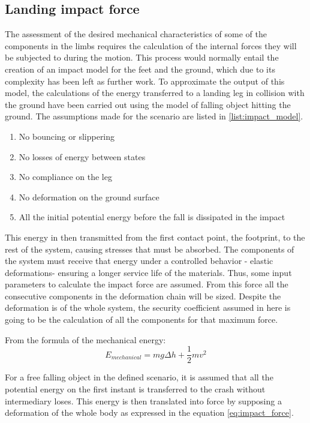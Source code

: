 \subsection{Landing impact force} %
\label{sub:impact_force}
The assessment of the desired mechanical characteristics of some of the components in the limbs requires the calculation of the internal forces they will be subjected to during the motion.
This process would normally entail the creation of an impact model for the feet and the ground, which due to its complexity has been left as further work.
To approximate the output of this model, the calculations of the energy transferred to a landing leg in collision with the ground have been carried out using the model of falling object hitting the ground.
The assumptions made for the scenario are listed in \ref{list:impact_model}.

\begin{enumerate}
\label{list:impact_model}
	\item No bouncing or slippering 
	\item No losses of energy between states
	\item No compliance on the leg
	\item No deformation on the ground surface
	\item All the initial potential energy before the fall is dissipated in the impact 
\end{enumerate}

This energy in then transmitted from the first contact point, the footprint, to the rest of the system, causing stresses that must be absorbed.
The components of the system must receive that energy under a controlled behavior - elastic deformations- ensuring a longer service life of the materials.
Thus, some input parameters to calculate the impact force are assumed.
From this force all the consecutive components in the deformation chain will be sized.
Despite the deformation is of the whole system, the security coefficient assumed in here is going to be the calculation of all the components for that maximum force.

From the formula of the mechanical energy:
\begin{equation}
  E_{mechanical} = m g \Delta h + \frac{1}{2} m v^{2}
\end{equation}

For a free falling object in the defined scenario, it is assumed that all the potential energy on the first instant is transferred to the crash without intermediary loses.
This energy is then translated into force by supposing a deformation of the whole body as expressed in the equation \ref{eq:impact_force}.

